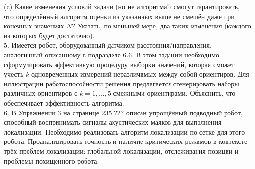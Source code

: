 \documentclass[10pt,a4paper]{article}
\begin{document}
(c) Какие изменения условий задачи (но не алгоритма!) смогут гарантировать, что определённый алгоритм оценки из указанных выше не смещён даже при конечных значениях $N$? Указать, по меньшей мере, два таких изменения (каждого из которых будет достаточно).\\

5. Имеется робот, оборудованный датчиком расстояния/направления, аналогичный описанному в подразделе 6.6. В этом задании необходимо сформулировать эффективную процедуру выборки значений, которая сможет учесть $k$ одновременных измерений неразличимых между собой ориентиров. Для иллюстрации работоспособности решения предлагается сгенерировать наборы различных ориентиров с $k = 1, . . . , 5$ смежными ориентирами. Объяснить, что обеспечивает эффективность алгоритма.\\

6. В Упражнении 3 на странице 235 ??? описан упрощённый подводный робот, способный воспринимать сигналы акустических маяков для выполнения локализации. Необходимо реализовать алгоритм локализации по сетке для этого робота. Проанализировать точность и наличие критических режимов в контексте трёх проблем локализации: глобальной локализации, отслеживания позиции и проблемы похищенного робота.\\







 
 
 
\end{document}
